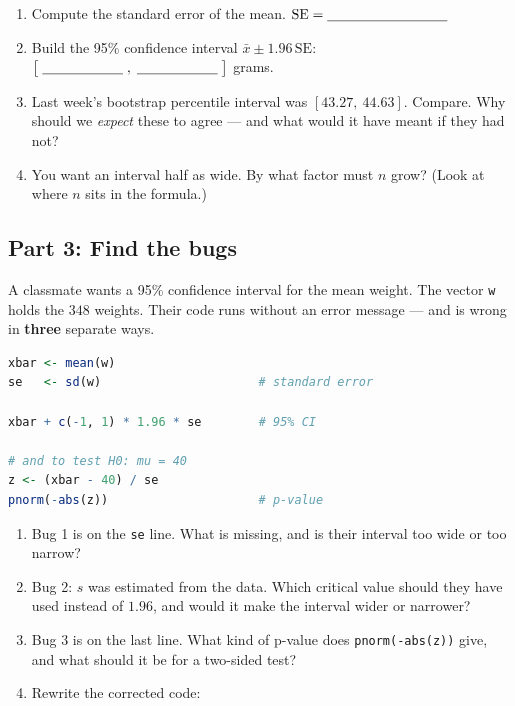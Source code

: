 \documentclass{article}
\newcommand{\blankline}[1]{\underline{\hspace{#1}}}
\begin{document}
\begin{enumerate}[label={\bfseries (\Alph*)},itemsep=.8em]
\item Compute the standard error of the mean. \hfill $\mathrm{SE} = \blankline{1.2in}$ \\[1em]
\item Build the 95\% confidence interval $\bar{x} \pm 1.96\,\mathrm{SE}$: \quad $\big[\;\blankline{.8in}\;,\;\blankline{.8in}\;\big]$ grams. \\[1em]
\item Last week's bootstrap percentile interval was $[43.27,\ 44.63]$. Compare. Why should we \emph{expect} these to agree --- and what would it have meant if they had not? \\[4em]
\item You want an interval half as wide. By what factor must $n$ grow? (Look at where $n$ sits in the formula.) \hfill \blankline{1.2in} \\[1.5em]
\end{enumerate}

\newpage

\subsection*{Part 3: Find the bugs}
A classmate wants a 95\% confidence interval for the mean weight. The vector \texttt{w} holds the $348$ weights. Their code runs without an error message --- and is wrong in \textbf{three} separate ways.

\begin{lstlisting}[language=R]
xbar <- mean(w)
se   <- sd(w)                      # standard error

xbar + c(-1, 1) * 1.96 * se        # 95% CI

# and to test H0: mu = 40
z <- (xbar - 40) / se
pnorm(-abs(z))                     # p-value
\end{lstlisting}

\begin{enumerate}[label={\bfseries (\Alph*)},itemsep=.8em]
\item Bug 1 is on the \texttt{se} line. What is missing, and is their interval too wide or too narrow? \\[3.5em]
\item Bug 2: $s$ was estimated from the data. Which critical value should they have used instead of $1.96$, and would it make the interval wider or narrower? \\[3.5em]
\item Bug 3 is on the last line. What kind of p-value does \texttt{pnorm(-abs(z))} give, and what should it be for a two-sided test? \\[3em]
\item Rewrite the corrected code: \\[5em]
\end{enumerate}
\end{document}
